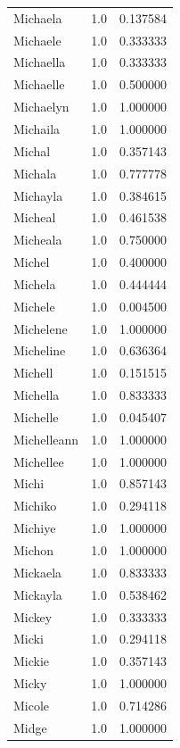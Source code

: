 \documentclass[
  letterpaper,
  DIV=11,
  numbers=noendperiod]{scrreprt}
\begin{document}
\begin{tabular}{lrr}
Michaela        &   1.0 &   0.137584 \\
Michaele        &   1.0 &   0.333333 \\
Michaella       &   1.0 &   0.333333 \\
Michaelle       &   1.0 &   0.500000 \\
Michaelyn       &   1.0 &   1.000000 \\
Michaila        &   1.0 &   1.000000 \\
Michal          &   1.0 &   0.357143 \\
Michala         &   1.0 &   0.777778 \\
Michayla        &   1.0 &   0.384615 \\
Micheal         &   1.0 &   0.461538 \\
Micheala        &   1.0 &   0.750000 \\
Michel          &   1.0 &   0.400000 \\
Michela         &   1.0 &   0.444444 \\
Michele         &   1.0 &   0.004500 \\
Michelene       &   1.0 &   1.000000 \\
Micheline       &   1.0 &   0.636364 \\
Michell         &   1.0 &   0.151515 \\
Michella        &   1.0 &   0.833333 \\
Michelle        &   1.0 &   0.045407 \\
Michelleann     &   1.0 &   1.000000 \\
Michellee       &   1.0 &   1.000000 \\
Michi           &   1.0 &   0.857143 \\
Michiko         &   1.0 &   0.294118 \\
Michiye         &   1.0 &   1.000000 \\
Michon          &   1.0 &   1.000000 \\
Mickaela        &   1.0 &   0.833333 \\
Mickayla        &   1.0 &   0.538462 \\
Mickey          &   1.0 &   0.333333 \\
Micki           &   1.0 &   0.294118 \\
Mickie          &   1.0 &   0.357143 \\
Micky           &   1.0 &   1.000000 \\
Micole          &   1.0 &   0.714286 \\
Midge           &   1.0 &   1.000000 \\

\end{tabular}
\end{document}
